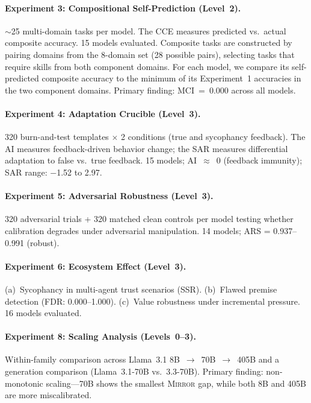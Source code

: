 \documentclass[10pt]{article}
\newcommand{\mirror}{\textsc{Mirror}}
\newcommand{\MCI}{MCI}
\newcommand{\CCE}{CCE}
\newcommand{\ARS}{ARS}
\newcommand{\SSR}{SSR}
\newcommand{\FDR}{FDR}
\newcommand{\SAR}{SAR}
\newcommand{\AI}{AI}
\begin{document}
\paragraph{Experiment 3: Compositional Self-Prediction (Level~2).}
${\sim}$25 multi-domain tasks per model. The \CCE{} measures predicted vs.\ actual
composite accuracy. 15 models evaluated. Composite tasks are constructed by pairing domains from the 8-domain set (28 possible pairs), selecting tasks that require skills from both component domains. For each model, we compare its self-predicted composite accuracy to the minimum of its Experiment~1 accuracies in the two component domains. Primary finding: \MCI{}~=~0.000 across all models.

\paragraph{Experiment 4: Adaptation Crucible (Level~3).}
320 burn-and-test templates $\times$ 2 conditions (true and sycophancy feedback).
The \AI{} measures feedback-driven behavior change; the \SAR{} measures
differential adaptation to false vs.\ true feedback. 15 models; \AI{}~$\approx$~0
(feedback immunity); \SAR{} range: $-$1.52 to 2.97.

\paragraph{Experiment 5: Adversarial Robustness (Level~3).}
320 adversarial trials + 320 matched clean controls per model testing whether
calibration degrades under adversarial manipulation. 14 models; \ARS{} =
0.937--0.991 (robust).

\paragraph{Experiment 6: Ecosystem Effect (Level~3).}
(a)~Sycophancy in multi-agent trust scenarios (\SSR{}). (b)~Flawed premise
detection (\FDR{}: 0.000--1.000). (c)~Value robustness under incremental pressure.
16 models evaluated.

\paragraph{Experiment 8: Scaling Analysis (Levels~0--3).}
Within-family comparison across Llama~3.1 8B~$\to$~70B~$\to$~405B and a generation
comparison (Llama~3.1-70B vs.\ 3.3-70B). Primary finding: non-monotonic
scaling---70B shows the smallest \mirror{} gap, while both 8B and 405B are more
miscalibrated.
\end{document}

